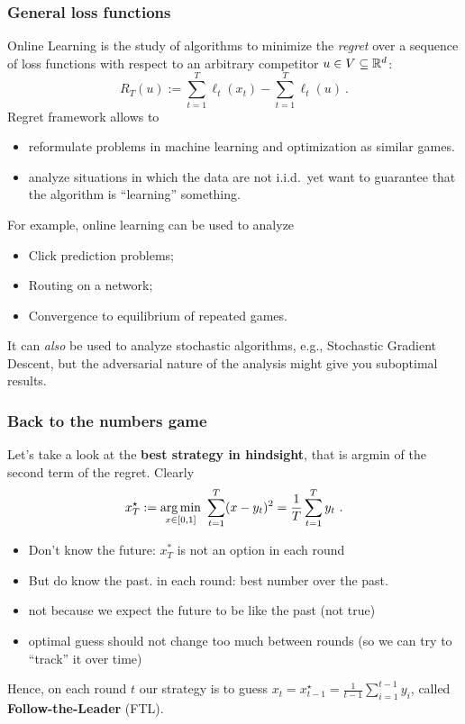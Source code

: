 \documentclass{beamer}
\begin{document}
\begin{frame}
  \frametitle{General loss functions}
  Online Learning is the study of algorithms to minimize the \emph{regret} over a sequence of loss functions with respect to an arbitrary competitor $u \in V\subseteq \mathbb{R}^d$:
  \[
    R_T(u):=\sum_{t=1}^T \ell_t(x_t) - \sum_{t=1}^T \ell_t(u)~.
  \]
  Regret framework allows to
  \begin{itemize}
    \item reformulate problems in machine learning and optimization as similar games.
    \item analyze situations in which the data are not i.i.d.\, yet want to guarantee that the algorithm is ``learning'' something.
  \end{itemize}

  For example, online learning can be used to analyze
  \begin{itemize}
    \item Click prediction problems;
    \item Routing on a network;
    \item Convergence to equilibrium of repeated games.
  \end{itemize}
  It can \emph{also} be used to analyze stochastic algorithms, e.g., Stochastic Gradient Descent, but the adversarial nature of the analysis might give you suboptimal results.
\end{frame}


\begin{frame}
  \frametitle{Back to the numbers game}
  Let's take a look at the \textbf{best strategy in hindsight}, that is argmin of the second term of the regret. Clearly
  \[
    x^\star_T := \operatorname*{arg\,min}_{x \in [0,1]} \ \sum_{t=1}^T (x - y_t)^2 = \frac{1}{T} \sum_{t=1}^T y_t~.
  \]
  \begin{itemize}
    \item Don't know the future: $x^*_T$ is not an option in each round
    \item But do know the past. in each round: best number over the past.
    \item not because we expect the future to be like the past (not true)
    \item optimal guess should not change too much between rounds (so we can try to ``track'' it over time)
  \end{itemize}
  Hence, on each round $t$ our strategy is to guess $x_t = x_{t-1}^\star=\frac{1}{t-1} \sum_{i=1}^{t-1} y_i$, called \textbf{Follow-the-Leader} (FTL).
\end{frame}
\end{document}
